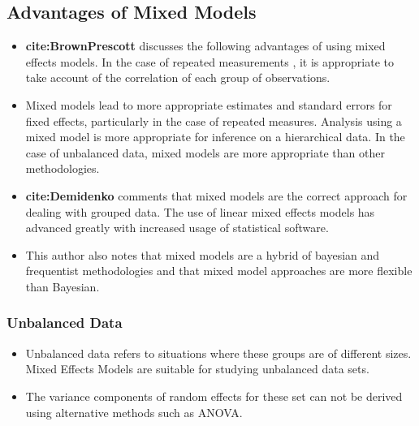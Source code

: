 \documentclass[main.tex]{subfiles}
\begin{document}
\subsection{Advantages of Mixed Models}
\begin{itemize}
\item \textbf{cite:BrownPrescott} discusses the  following advantages of using
mixed effects models. In the case of repeated measurements , it is
appropriate to take account of the correlation of each group of
observations. 
\item 
Mixed models lead to more appropriate estimates and
standard errors for fixed effects, particularly in the case of
repeated measures. Analysis using a mixed model is more
appropriate for inference on a hierarchical data. In the case of
unbalanced data, mixed models are more appropriate than other
methodologies.
\item 
\textbf{cite:Demidenko} comments that mixed models are the correct approach
for dealing with grouped data. The use of linear mixed effects
models has advanced greatly with increased usage of statistical
software. 
\item 
This author also notes that mixed models are a hybrid of
bayesian and frequentist methodologies and that mixed model
approaches are more flexible than Bayesian.
\end{itemize}

\subsubsection{Unbalanced Data} 
\begin{itemize}
\item Unbalanced data refers to situations where these groups are
of different sizes. Mixed Effects Models are suitable for studying
unbalanced data sets. 
\item The variance components of random effects
for these set can not be derived using alternative methods such as
ANOVA.
\end{itemize}
\end{document}
